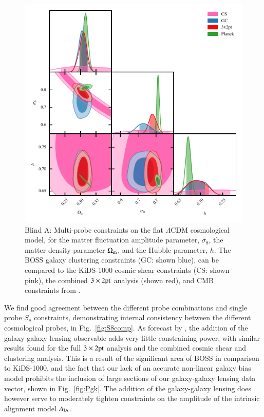 \begin{figure}
	\begin{center}
		\includegraphics[width=\columnwidth]{Parameter_Plots/cosmology/omegam_sigma8_h_blind_A}
		\caption{Blind A: Multi-probe constraints on the flat $\Lambda$CDM cosmological model, for the matter fluctuation amplitude parameter, $\sigma_8$, the matter density parameter $\Omega_{\rm m}$, and the Hubble parameter, $h$.  The BOSS galaxy clustering constraints (GC: shown blue), can be compared to the KiDS-1000 cosmic shear constraints (CS: shown pink), the combined $3\times2{\rm pt}$ analysis (shown red), and CMB constraints from \citet{planck/etal:2018}.}
		\label{fig:cosmology-params}
	\end{center}
\end{figure}

We find good agreement between the different probe combinations and single probe $S_8$ constraints, demonstrating internal consistency between the different cosmological probes, in Fig.~\ref{fig:S8comp}.  As forecast by \citet{joachimi/etal:inprep}, the addition of the galaxy-galaxy lensing observable adds very little constraining power, with similar results found for the full $3\times2{\rm pt}$ analysis and the combined cosmic shear and clustering analysis.   This is a result of the significant area of BOSS in comparison to KiDS-1000, and the fact that our lack of an accurate non-linear galaxy bias model prohibits the inclusion of large sections of our galaxy-galaxy lensing data vector, shown in Fig.~\ref{fig:Pgk}.     The addition of the galaxy-galaxy lensing does however serve to moderately tighten constraints on the amplitude of the intrinsic alignment model $A_{\rm IA}$. 

